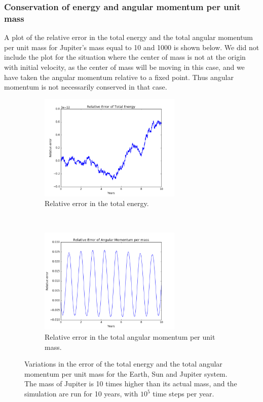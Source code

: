 \documentclass[a4paper, 10pt]{article}
\begin{document}
\subsubsection{Conservation of energy and angular momentum per unit mass}
A plot of the relative error in the total energy and the total angular momentum per unit mass for Jupiter's mass equal to 10 and 1000 is shown below. We did not include the plot for the situation where the center of mass is not at the origin with initial velocity, as the center of mass will be moving in this case, and we have taken the angular momentum relative to a fixed point. Thus angular momentum is not necessarily conserved in that case.
\begin{figure}[t!]
    \centering
    \begin{subfigure}[t]{0.5\textwidth}
        \centering
        \includegraphics[height=2.0in]{relErrEnSEJx10.png}
        \caption{Relative error in the total energy.}
    \end{subfigure}%
    ~ 
    \begin{subfigure}[t]{0.5\textwidth}
        \centering
        \includegraphics[height=2.0in]{relErrMomSEJx10.png}
        \caption{Relative error in the total angular momentum per unit mass.}
    \end{subfigure}
    \caption{Variations in the error of the total energy and the total angular momentum per unit mass for the Earth, Sun and Jupiter system. The mass of Jupiter is 10 times higher than its actual mass, and the simulation are run for 10 years, with $10^5$ time steps per year.}\label{fig:Energy_jupiter_10}
\end{figure}
\end{document}
